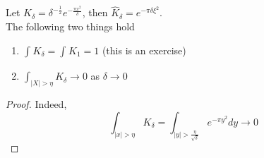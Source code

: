 \documentclass[../main.tex]{subfiles}
\begin{document}
\begin{crly}
Let $K_\delta= \delta ^{-\frac{1}{2}} e^{ - \frac{\pi x ^{2}}{\delta}} $, then $\hat{K}_\delta = e^{- \pi \delta \xi^{2}} $.\\
The following two things hold
\begin{enumerate}
\item $ \int_{  }^{  } K_\delta = \int_{  }^{  }K_1 = 1$ (this is an exercise) 
\item $ \int_{ |X| > \eta }^{  } K_\delta \to 0$ as $\delta \to 0$ 
\end{enumerate}
\end{crly}
\begin{proof}
Indeed,
\[ 
\int_{ |x| > \eta }^{  } K_\delta = \int_{ |y| > \frac{\eta}{ \sqrt{\delta} } }^{  } e^{- \pi y^{2}} dy \to 0
\]

\end{proof}
\end{document}
